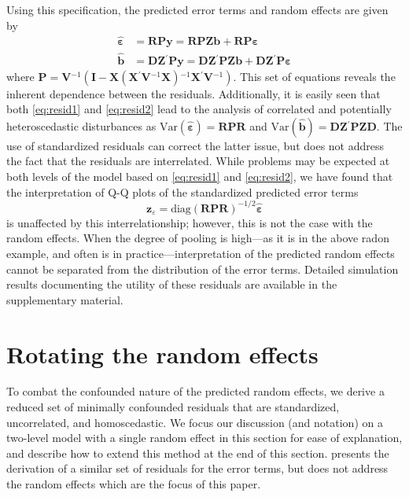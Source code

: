 \documentclass[12pt]{article} %
\newcommand{\hh}[1]{{\color{orange} #1}}
\newcommand{\al}[1]{{\color{red} #1}}
\newcommand{\inv}{\ensuremath{^{-1}}}
\newcommand{\trans}{\ensuremath{^\prime}}
\newcommand{\var}{\ensuremath{\mathrm{Var}}}
\begin{document}
Using this specification, the predicted error terms and random effects are given by 
%
\begin{align}
\widehat{\bm{\varepsilon}} &= \bm{RPy} = \bm{RPZb} + \bm{RP \varepsilon} \label{eq:resid1}\\
\widehat{\bm{b}} &= \bm{DZ}\trans \bm{Py} = \bm{DZ}\trans \bm{PZb} + \bm{DZ}\trans \bm{P \varepsilon} \label{eq:resid2}
\end{align}
%
where $\bm{P} = \bm{V}\inv( \bm{I} - \bm{X} (\bm{X}\trans \bm{V}\inv \bm{X})\inv \bm{X}\trans \bm{V}\inv)$. This  set of equations %
reveals the inherent dependence between the residuals.
Additionally, it is easily seen that both \eqref{eq:resid1} and \eqref{eq:resid2} lead to the analysis of correlated and potentially heteroscedastic disturbances as $\var(\widehat{\bm{\varepsilon}}) = \bm{RPR}$ and $\var(\widehat{\bm{b}}) = \bm{DZ}\trans \bm{PZD}$.
\al{
The use of standardized residuals can correct the latter issue, but does not address the fact that the residuals are interrelated. While problems may be expected at both levels of the model based on \eqref{eq:resid1} and \eqref{eq:resid2}, we have found that the interpretation of Q-Q plots of the standardized predicted error terms
%
\[
\bm{z}_{\varepsilon} =  \text{diag} \left(\bm{RPR} \right)^{-1/2} \widehat{\bm{\varepsilon}}
\]
%
is unaffected by this interrelationship; however, this is not the case with the random effects.  When the degree of pooling is high---as it is in the above radon example, and often is in practice---interpretation of the predicted random effects cannot be separated from the distribution of the error terms. Detailed simulation results \hh{documenting} the utility of  these residuals are available in the supplementary material.
}


\section{Rotating the random effects}\label{sec:rotate}

To combat \al{the confounded nature of the predicted random effects}, we derive a reduced set of minimally confounded residuals that are standardized, uncorrelated, and homoscedastic. \al{We focus our discussion (and notation) on a two-level model with a single random effect in this section for ease of explanation, and describe how to extend this method at the end of this section.} \cite{HildenMinton:1995wh} presents the derivation of a similar set of residuals for the error terms, but does not address the random effects which are the focus of this paper. 
\end{document}
